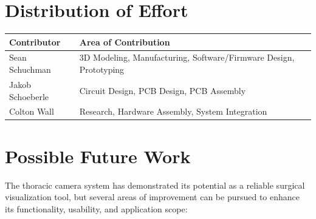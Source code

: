 \section{Distribution of Effort}
\begin{tabular}{|l|l|}
    \hline
    Contributor & Area of Contribution \\ \hline
    Sean Schuchman & 3D Modeling, Manufacturing, Software/Firmware Design, Prototyping \\ \hline
    Jakob Schoeberle & Circuit Design, PCB Design, PCB Assembly \\ \hline
    Colton Wall & Research, Hardware Assembly, System Integration \\ \hline
\end{tabular}

\section{Possible Future Work}
The thoracic camera system has demonstrated its potential as a reliable surgical visualization tool, but several areas of improvement can be pursued to enhance its functionality, usability, and application scope:

